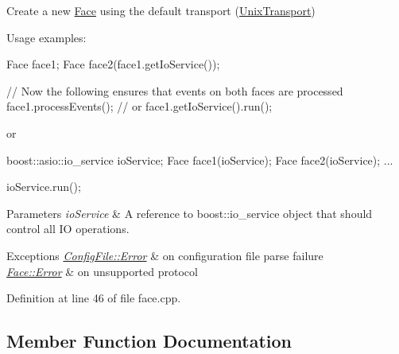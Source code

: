 Create a new \hyperlink{classndn_1_1Face}{Face} using the default transport (\hyperlink{classndn_1_1UnixTransport}{Unix\+Transport}) 

\begin{DoxyParagraph}{Usage examples\+:}
\begin{DoxyVerb}Face face1;
Face face2(face1.getIoService());

// Now the following ensures that events on both faces are processed
face1.processEvents();
// or face1.getIoService().run();
\end{DoxyVerb}

\end{DoxyParagraph}
\begin{DoxyParagraph}{or}
\begin{DoxyVerb}boost::asio::io_service ioService;
Face face1(ioService);
Face face2(ioService);
...

ioService.run();
\end{DoxyVerb}

\end{DoxyParagraph}

\begin{DoxyParams}{Parameters}
{\em io\+Service} & A reference to boost\+::io\+\_\+service object that should control all IO operations. \\
\hline
\end{DoxyParams}

\begin{DoxyExceptions}{Exceptions}
{\em \hyperlink{classndn_1_1ConfigFile_1_1Error}{Config\+File\+::\+Error}} & on configuration file parse failure \\
\hline
{\em \hyperlink{classndn_1_1Face_1_1Error}{Face\+::\+Error}} & on unsupported protocol \\
\hline
\end{DoxyExceptions}


Definition at line 46 of file face.\+cpp.



\subsection{Member Function Documentation}
